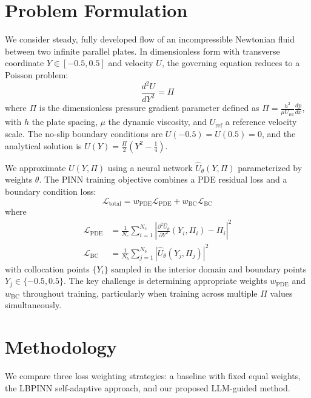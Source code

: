 \documentclass{article}
\begin{document}
\section{Problem Formulation}

We consider steady, fully developed flow of an incompressible Newtonian fluid between two infinite parallel plates. In dimensionless form with transverse coordinate $Y \in [-0.5, 0.5]$ and velocity $U$, the governing equation reduces to a Poisson problem:
\begin{equation}
\frac{d^2 U}{dY^2} = \Pi
\end{equation}
where $\Pi$ is the dimensionless pressure gradient parameter defined as $\Pi = \frac{h^2}{\mu U_{\mathrm{ref}}} \frac{dp}{dx}$, with $h$ the plate spacing, $\mu$ the dynamic viscosity, and $U_{\mathrm{ref}}$ a reference velocity scale. The no-slip boundary conditions are $U(-0.5) = U(0.5) = 0$, and the analytical solution is $U(Y) = \frac{\Pi}{2}(Y^2 - \frac{1}{4})$.

We approximate $U(Y, \Pi)$ using a neural network $\hat{U}_\theta(Y, \Pi)$ parameterized by weights $\theta$. The PINN training objective combines a PDE residual loss and a boundary condition loss:
\begin{equation}
\mathcal{L}_{\text{total}} = w_{\text{PDE}} \mathcal{L}_{\text{PDE}} + w_{\text{BC}} \mathcal{L}_{\text{BC}}
\label{eq:total_loss}
\end{equation}
where
\begin{align}
\mathcal{L}_{\text{PDE}} &= \frac{1}{N_c} \sum_{i=1}^{N_c} \left|\frac{\partial^2 \hat{U}_\theta}{\partial Y^2}(Y_i, \Pi_i) - \Pi_i\right|^2 \\
\mathcal{L}_{\text{BC}} &= \frac{1}{N_b} \sum_{j=1}^{N_b} |\hat{U}_\theta(Y_j, \Pi_j)|^2
\end{align}
with collocation points $\{Y_i\}$ sampled in the interior domain and boundary points $Y_j \in \{-0.5, 0.5\}$. The key challenge is determining appropriate weights $w_{\text{PDE}}$ and $w_{\text{BC}}$ throughout training, particularly when training across multiple $\Pi$ values simultaneously.

\section{Methodology}

We compare three loss weighting strategies: a baseline with fixed equal weights, the LBPINN self-adaptive approach, and our proposed LLM-guided method.
\end{document}
